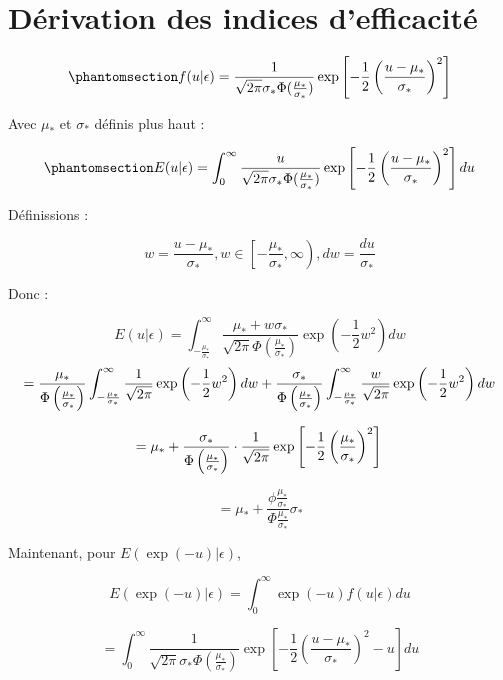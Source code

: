 \documentclass[
  12pt,
]{report}
\begin{document}
\section{Dérivation des indices
d'efficacité}\label{duxe9rivation-des-indices-defficacituxe9}

\begin{equation}\phantomsection\label{eq-f-u-epsilon}{
f(u|\epsilon) = \frac{1}{\sqrt{2 \pi}\sigma_* \Phi(\frac{\mu_*}{\sigma_*})} \exp\left[- \frac{1}{2}\left(\frac{u - \mu_*}{\sigma_*}\right)^2\right]
}\end{equation}

Avec \(\mu_*\) et \(\sigma_*\) définis plus haut :

\begin{equation}\phantomsection\label{eq-expected-u-epsilon}{
E(u | \epsilon) =  \int_{0}^{\infty} \frac{u}{\sqrt{2 \pi}\sigma_* \Phi(\frac{\mu_*}{\sigma_*})} \exp\left[- \frac{1}{2}\left(\frac{u - \mu_*}{\sigma_*}\right)^2\right] du
}\end{equation}

Définissions :

\[
w = \frac{u - \mu_*}{\sigma_*},   w \in \left[ -\frac{\mu_*}{\sigma_*}, \infty \right), dw = \frac{du}{\sigma_*}
\]

Donc :

\[
E(u | \epsilon) =  \int_{- \frac{\mu_*}{\sigma_*}}^{\infty} \frac{\mu_* + w\sigma_*}{\sqrt{2 \pi} \Phi \left(\frac{\mu_*}{\sigma_*}\right)} \exp \left(- \frac{1}{2} w^2 \right) dw
\] \[
= \frac{\mu_*}{\Phi \left(\frac{\mu_*}{\sigma_*}\right)} \int_{- \frac{\mu_*}{\sigma_*}}^{\infty} \frac{1}{\sqrt{2 \pi}} \exp \left(- \frac{1}{2} w^2 \right)dw + \frac{\sigma_*}{\Phi \left(\frac{\mu_*}{\sigma_*} \right)} \int_{- \frac{\mu_*}{\sigma_*}}^{\infty} \frac{w}{\sqrt{2 \pi}} \exp \left(- \frac{1}{2} w^2 \right)dw\\
\]

\[
= \mu_* + \frac{\sigma_*}{\Phi \left(\frac{\mu_*}{\sigma_*} \right)} \cdot \frac{1}{\sqrt{2 \pi}} \exp \left[- \frac{1}{2} \left(\frac{\mu_*}{\sigma_*} \right)^2 \right]\\
\]

\[
= \mu_* + \frac{\phi \frac{\mu_*}{\sigma_*}}{\Phi \frac{\mu_*}{\sigma_*}} \sigma_*
\]

Maintenant, pour \(E(\exp(- u) | \epsilon)\),

\[
E(\exp(- u)| \epsilon) = \int_{0}^{\infty} \exp(-u) f(u | \epsilon) du 
\]

\[
= \int_{0}^{\infty} \frac{1}{\sqrt{2 \pi}\sigma_* \Phi(\frac{\mu_*}{\sigma_*})} \exp\left[- \frac{1}{2}\left(\frac{u - \mu_*}{\sigma_*}\right)^2 - u\right] du
\]
\end{document}
